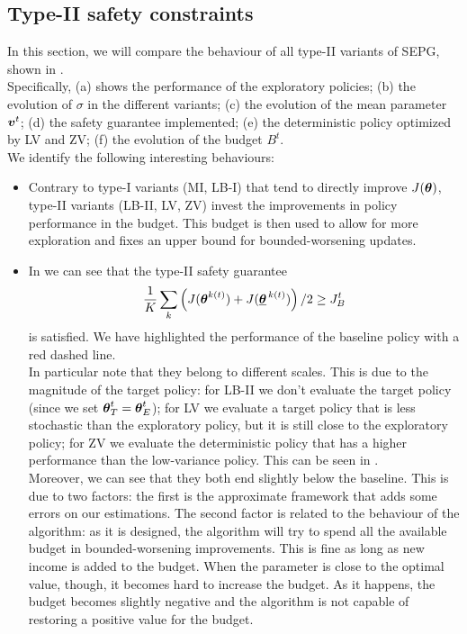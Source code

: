 \subsection{Type-II safety constraints}
In this section, we will compare the behaviour of all type-II variants of SEPG, shown in . \\
Specifically, (a) shows the performance of the exploratory policies; (b) the evolution of $\sigma$ in the different variants; (c) the evolution of the mean parameter $\vv^t$; (d) the safety guarantee implemented; (e) the deterministic policy optimized by LV and ZV; (f) the evolution of the budget $B^t$. \\
We identify the following interesting behaviours:
\begin{itemize}
\item Contrary to type-I variants (MI, LB-I) that  tend to directly improve $J(\vtheta)$, type-II variants (LB-II, LV, ZV) invest the improvements in policy performance in the budget. This budget is then used to allow for more exploration and fixes an upper bound for bounded-worsening updates. 
\item In  we can see that the type-II safety guarantee
\[
\frac{1}{K}\sum_k \left(J(\vtheta^{k(t)}) + J(\vtarget[k(t)])\right)/2 \geq \jbase
\]
is satisfied. We have highlighted the performance of the baseline policy with a red dashed line. \\
In particular note that they belong to different scales. This is due to the magnitude of the target policy: for LB-II we don't evaluate the target policy (since we set $\vtheta^t_T = \vtheta^t_E$); for LV we evaluate a target policy that is less stochastic than the exploratory policy, but it is still close to the exploratory policy; for ZV we evaluate the deterministic policy that has a higher performance than the low-variance policy. This can be seen in . \\
Moreover, we can see that they both end slightly below the baseline. This is due to two factors: the first is the approximate framework that adds some errors on our estimations. The second factor is related to the behaviour of the algorithm: as it is designed, the algorithm will try to spend all the available budget in bounded-worsening improvements. This is fine as long as new income is added to the budget. When the parameter is close to the optimal value, though, it becomes hard to increase the budget. As it happens, the budget becomes slightly negative and the algorithm is not capable of restoring a positive value for the budget. 


\end{itemize}
